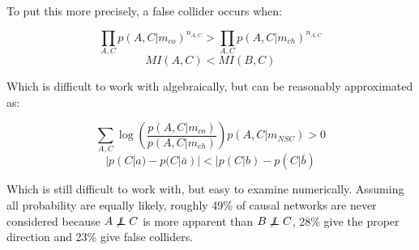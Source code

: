 \documentclass[twocolumn,12pt]{article}
\newcommand\indep{\protect\mathpalette{\protect\independenT}{\perp}}
\def\independenT#1#2{\mathrel{\rlap{$#1#2$}\mkern2mu{#1#2}}}
\begin{document}
To put this more precisely, a false collider occurs when:

\begin{equation*}
  \prod_{A,C} p(A,C|m_{co})^{n_{A,C}}  > 
  \prod_{A,C} p(A,C|m_{ch})^{n_{A,C}}
\end{equation*}
\begin{equation*}
  MI(A,C)  <  MI(B,C)
\end{equation*}

Which is difficult to work with algebraically, but can be reasonably
approximated as:

\begin{equation*}
  \sum_{A,C} \log \left ( \frac{p(A,C|m_{co})}{p(A,C|m_{ch})} \right )
  p(A,C|m_{NSC})  >  0
\end{equation*}
\begin{equation*}
  |p(C|a)-p(C|\bar{a})|  <  |p(C|b)-p(C|\bar{b})
\end{equation*}

Which is still difficult to work with, but easy to examine
numerically.  Assuming all probability are equally likely, roughly
49\% of causal networks are never considered because $A\not\indep C$
is more apparent than $B\not\indep C$, 28\% give the proper direction
and 23\% give false colliders.
\end{document}
